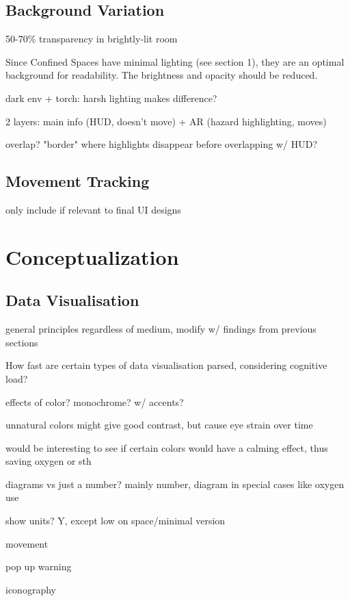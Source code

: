 \subsection{Background Variation}

50-70\% transparency in brightly-lit room \parencite{hussainEffectTransparencyLevels2024}

Since Confined Spaces have minimal lighting (see section 1), they are an optimal background for readability. The brightness and opacity should be reduced.

dark env + torch: harsh lighting makes difference?

2 layers: main info (HUD, doesn't move) + AR (hazard highlighting, moves)

overlap? "border" where highlights disappear before overlapping w/ HUD?

\subsection{Movement Tracking}

only include if relevant to final UI designs

\section{Conceptualization}

\subsection{Data Visualisation}

general principles regardless of medium, modify w/ findings from previous sections

How fast are certain types of data visualisation parsed, considering cognitive load?

effects of color? monochrome? w/ accents?

unnatural colors might give good contrast, but cause eye strain over time

would be interesting to see if certain colors would have a calming effect, thus saving oxygen or sth

diagrams vs just a number? mainly number, diagram in special cases like oxygen use

show units? Y, except low on space/minimal version

movement

pop up warning

iconography


